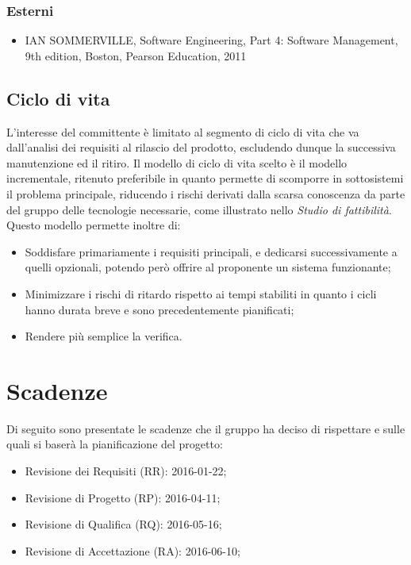 \documentclass[11pt,a4paper]{article}
\begin{document}
\subsubsection{Esterni}
\begin{itemize}
\item IAN SOMMERVILLE, Software Engineering, Part 4: Software Management, 9th edition, Boston, Pearson Education, 2011
\end{itemize}

\subsection{Ciclo di vita}
L’interesse del committente è limitato al segmento di ciclo di vita che va dall’analisi dei requisiti al
rilascio del prodotto, escludendo dunque la successiva manutenzione ed il ritiro. Il modello di ciclo di
vita scelto è il modello incrementale, ritenuto preferibile in quanto permette di scomporre in sottosistemi
il problema principale, riducendo i rischi derivati dalla scarsa conoscenza da parte del gruppo delle
tecnologie necessarie, come illustrato nello \textit{Studio di fattibilità}. Questo modello permette inoltre di:
\begin{itemize}
\item Soddisfare primariamente i requisiti principali, e dedicarsi successivamente a quelli opzionali,
potendo però offrire al proponente un sistema funzionante;
\item Minimizzare i rischi di ritardo rispetto ai tempi stabiliti in quanto i cicli hanno durata breve e
sono precedentemente pianificati;
\item Rendere più semplice la verifica.
\end{itemize}

\section{Scadenze}
Di seguito sono presentate le scadenze che il gruppo ha deciso di rispettare e sulle quali si baserà la pianificazione del progetto:
\begin{itemize}
\item Revisione dei Requisiti (RR): 2016-01-22;
\item Revisione di Progetto (RP): 2016-04-11;
\item Revisione di Qualifica (RQ): 2016-05-16;
\item Revisione di Accettazione (RA): 2016-06-10;
\end{itemize}
\end{document}

